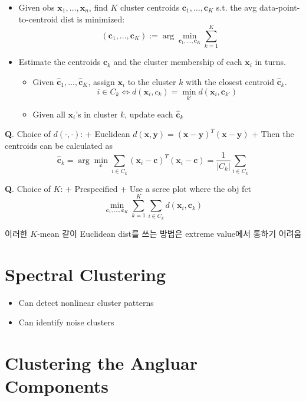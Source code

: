 \documentclass[
  13pt,
  letterpaper,
  DIV=11,
  numbers=noendperiod]{scrreprt}
\providecommand{\tightlist}{%
  \setlength{\itemsep}{0pt}\setlength{\parskip}{0pt}}\usepackage{longtable,booktabs,array}
\theoremstyle{definition}
\theoremstyle{plain}
\theoremstyle{definition}
\theoremstyle{plain}
\theoremstyle{plain}
\theoremstyle{definition}
\theoremstyle{remark}
\begin{document}
\begin{itemize}
\item
  Given obs \(\pmb{x}_1, \ldots, \pmb{x}_n\), find \(K\) cluster
  centroids \(\pmb{c}_1, \ldots, \pmb{c}_K\) s.t. the avg
  data-point-to-centroid dist is minimized: \[
  (\pmb{c}_1, \ldots, \pmb{c}_K) := \arg\min_{\pmb{c}_1, \ldots, \pmb{c}_K} \sum_{k=1}^K 
  \]
\item
  Estimate the centroids \(\pmb{c}_k\) and the cluster membership of
  each \(\pmb{x}_i\) in turns.

  \begin{itemize}
  \tightlist
  \item
    Given \(\hat{\pmb{c}}_1, \ldots, \hat{\pmb{c}}_K\), assign
    \(\pmb{x}_i\) to the cluster \(k\) with the closest centroid
    \(\hat{\pmb{c}}_k\). \[
    i \in C_k \Longleftrightarrow d(\pmb{x}_i, c_k) = \min_{k'}d(\pmb{x}_i, \pmb{c}_{k'})
    \]
  \item
    Given all \(\pmb{x}_i\)'s in cluster \(k\), update each
    \(\hat{\pmb{c}}_k\)
  \end{itemize}
\end{itemize}

\textbf{Q}. Choice of \(d(\cdot, \cdot)\): + Euclidean
\(d(\pmb{x}, \pmb{y}) = (\pmb{x}- \pmb{y})^T(\pmb{x}- \pmb{y})\) + Then
the centroids can be calculated as \[
  \hat{\pmb{c}}_k = \arg\min_{\pmb{c}} \sum_{i\in C_k}(\pmb{x}_i - \pmb{c})^T(\pmb{x}_i - \pmb{c}) = \frac{1}{|C_k|} \sum_{i\in C_k}
  \]

\textbf{Q}. Choice of \(K\): + Prespecified + Use a scree plot where the
obj fct \[
  \min_{\pmb{c}_1, \ldots, \pmb{c}_K} \sum_{k=1}^K \sum_{i \in C_k} d(\pmb{x}_i , \pmb{c}_k)
  \]

이러한 \(K\)-mean 같이 Euclidean dist를 쓰는 방법은 extreme value에서
통하기 어려움

\section{Spectral Clustering}\label{spectral-clustering}

\begin{itemize}
\item
  Can detect nonlinear cluster patterns
\item
  Can identify noise clusters
\end{itemize}

\section{Clustering the Angluar
Components}\label{clustering-the-angluar-components}
\end{document}
